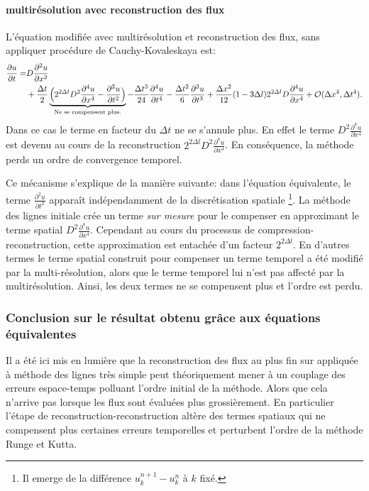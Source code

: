     \paragraph{multirésolution avec reconstruction des flux}
        L'équation modifiée avec multirésolution et reconstruction des flux, sans appliquer procédure de Cauchy-Kovaleskaya est:
        \begin{align}
            \frac{\partial u}{\partial  t} =&D \frac{\partial^{2} u}{\partial x^{2}}\\\notag
            &+ \frac{\Delta t}{2} \underbrace{\Bigl(2^{2 \Delta l} D^{2}           \frac{\partial^{4} u}{\partial x^{4}} -\frac{\partial^{2} u}{\partial t^{2}} \Bigr)}_{\text{Ne se compensent plus.}}
            -\frac{\Delta t^{3}}{24}                          \frac{\partial^{4} u}{\partial t^{4}} 
            - \frac{\Delta t^{2}}{6}                           \frac{\partial^{3} u}{\partial t^{3}}
            +\frac{\Delta x^{2}}{12} (1 - 3\Delta l)    2^{2 \Delta l} D \frac{\partial^{4} u}{\partial x^{4}}
            + \mathcal{O}(\Delta x^4 , \Delta t^4).
        \end{align}
        Dans ce cas le terme en facteur du $\Delta t$ ne se s'annule plus. En effet le terme $D^{2}\frac{\partial^{4} u}{\partial x^{4}}$ est devenu au cours de la reconstruction
        $2^{2 \Delta l} D^{2}\frac{\partial^{4} u}{\partial x^{4}}$. En conséquence, la méthode perds un ordre de convergence temporel.\par
        Ce mécanisme s'explique de la manière suivante: dans l'équation équivalente, le terme $\frac{\partial^{2} u}{\partial t^{2}}$ apparaît indépendamment de la discrétisation spatiale
        \footnote{Il emerge de la différence $u_k^{n+1} - u_k^{n}$ à $k$ fixé.}. La méthode des lignes initiale crée un terme \textit{sur mesure} pour le compenser en approximant le terme spatial
        $D^{2}\frac{\partial^{4} u}{\partial x^{4}}$. Cependant au cours du processus de compression-reconstruction, cette approximation est entachée d'un facteur $2^{2 \Delta l}$.
        En d'autres termes le terme spatial construit pour compenser un terme temporel a été modifié par la multi-résolution, alors que le terme temporel lui n'est pas affecté par la multirésolution.
        Ainsi, les deux termes ne se compensent plus et l'ordre est perdu.
\subsubsection{Conclusion sur le résultat obtenu grâce aux équations équivalentes}
    Il a été ici mis en lumière que la reconstruction des flux au plus fin sur appliquée à méthode des lignes très simple
    peut théoriquement mener à un couplage des erreurs espace-temps polluant l'ordre initial de la méthode.
    Alors que cela n'arrive pas lorsque les flux sont évaluées plus grossièrement.
    En particulier l'étape de reconstruction-reconstruction altère des termes spatiaux qui ne compensent plus certaines erreurs temporelles et perturbent l'ordre de la méthode Runge et Kutta.